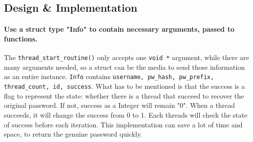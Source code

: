 \documentclass{article}
\begin{document}
\subsection{Design & Implementation}
\paragraph{Use a struct type "Info" to contain necessary arguments, passed to functions.} The \texttt{thread\_start\_routine()} only accepts one \texttt{void *} argument, while there are many arguments needed, so a struct can be the media to send those information as an entire instance. \texttt{Info} contains \texttt{username, pw\_hash, pw\_prefix, thread\_count, id, success}. What has to be mentioned is that the success is a flag to represent the state: whether there is a thread that succeed to recover the original password. If not, success as a Integer will remain "0". When a thread succeeds, it will change the success from 0 to 1. Each threads will check the state of success before each iteration. This implementation can save a lot of time and space, to return the genuine password quickly.
\end{document}
